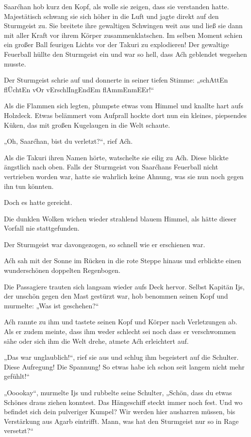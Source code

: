 Saarćhan hob kurz den Kopf, als wolle sie zeigen, dass sie verstanden hatte. Majestätisch schwang sie sich höher in die Luft und jagte direkt auf den Sturmgeist zu. Sie breitete ihre gewaltigen Schwingen weit aus und ließ sie dann mit aller Kraft vor ihrem Körper zusammenklatschen. Im selben Moment schien ein großer Ball feurigen Lichts vor der Takuri zu explodieren! Der gewaltige Feuerball hüllte den Sturmgeist ein und war so hell, dass Aćh geblendet wegsehen musste.

Der Sturmgeist schrie auf und donnerte in seiner tiefen Stimme: „schAttEn flÜchtEn vOr vErschlIngEndEm flAmmEnmEEr!“

Als die Flammen sich legten, plumpste etwas vom Himmel und knallte hart aufs Holzdeck. Etwas belämmert vom Aufprall hockte dort nun ein kleines, piepsendes Küken, das mit großen Kugelaugen in die Welt schaute.

„Oh, Saarćhan, bist du verletzt?“, rief Aćh.

Als die Takuri ihren Namen hörte, watschelte sie eilig zu Aćh. Diese blickte ängstlich nach oben. Falls der Sturmgeist von Saarćhans Feuerball nicht vertrieben worden war, hatte sie wahrlich keine Ahnung, was sie nun noch gegen ihn tun könnten.

Doch es hatte gereicht.

Die dunklen Wolken wichen wieder strahlend blauem Himmel, als hätte dieser Vorfall nie stattgefunden.

Der Sturmgeist war davongezogen, so schnell wie er erschienen war.

Aćh sah mit der Sonne im Rücken in die rote Steppe hinaus und erblickte einen wunderschönen doppelten Regenbogen.

Die Passagiere trauten sich langsam wieder aufs Deck hervor. Selbst Kapitän Ijs, der unschön gegen den Mast gestürzt war, hob benommen seinen Kopf und murmelte: „Was ist geschehen?“

Aćh rannte zu ihm und tastete seinen Kopf und Körper nach Verletzungen ab. Als er zudem meinte, dass ihm weder schlecht sei noch dass er verschwommen sähe oder sich ihm die Welt drehe, atmete Aćh erleichtert auf.

„Das war unglaublich!“, rief sie aus und schlug ihm begeistert auf die Schulter. Diese Aufregung! Die Spannung! So etwas habe ich schon seit langem nicht mehr gefühlt!“

„Ooookay“, murmelte Ijs und rubbelte seine Schulter, „Schön, dass du etwas Schönes draus ziehen konntest. Das Hängeschiff steckt immer noch fest. Und wo befindet sich dein pulveriger Kumpel? Wir werden hier ausharren müssen, bis Verstärkung aus Agarb eintrifft. Mann, was hat den Sturmgeist nur so in Rage versetzt?“

